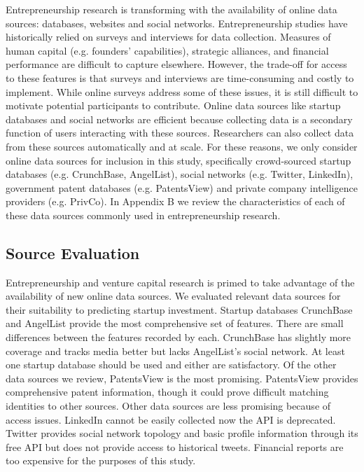 \documentclass[../thesis/thesis.tex]{subfiles}
\begin{document}
Entrepreneurship research is transforming with the availability of online data sources: databases, websites and social networks. Entrepreneurship studies have historically relied on surveys and interviews for data collection. Measures of human capital (e.g. founders' capabilities), strategic alliances, and financial performance are difficult to capture elsewhere. However, the trade-off for access to these features is that surveys and interviews are time-consuming and costly to implement. While online surveys address some of these issues, it is still difficult to motivate potential participants to contribute. Online data sources like startup databases and social networks are efficient because collecting data is a secondary function of users interacting with these sources. Researchers can also collect data from these sources automatically and at scale. For these reasons, we only consider online data sources for inclusion in this study, specifically crowd-sourced startup databases (e.g. CrunchBase, AngelList), social networks (e.g. Twitter, LinkedIn), government patent databases (e.g. PatentsView) and private company intelligence providers (e.g. PrivCo). In Appendix B we review the characteristics of each of these data sources commonly used in entrepreneurship research.

\subsection{Source Evaluation}

Entrepreneurship and venture capital research is primed to take advantage of the availability of new online data sources. We evaluated relevant data sources for their suitability to predicting startup investment. Startup databases CrunchBase and AngelList provide the most comprehensive set of features. There are small differences between the features recorded by each. CrunchBase has slightly more coverage and tracks media better but lacks AngelList's social network. At least one startup database should be used and either are satisfactory. Of the other data sources we review, PatentsView  is the most promising. PatentsView provides comprehensive patent information, though it could prove difficult matching identities to other sources. Other data sources are less promising because of access issues. LinkedIn cannot be easily collected now the API is deprecated. Twitter provides social network topology and basic profile information through its free API but does not provide access to historical tweets. Financial reports are too expensive for the purposes of this study.
\end{document}
